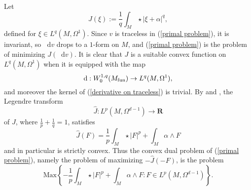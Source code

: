\documentclass[reqno,11pt]{amsart}
\newcommand{\RR}{\mathbf{R}}
\newcommand*\dif{\mathop{}\!\mathrm{d}}
\newcommand{\Max}{\mathrm{Max}}
\theoremstyle{definition}
\numberwithin{equation}{section}
\begin{document}
Let
$$J(\xi) := \frac{1}{q} \int_M \star|\xi + \alpha|^q,$$
defined for $\xi \in L^q(M, \Omega^1)$.
Since $v$ is traceless in (\ref{primal problem}), it is invariant, so $\dif v$ drops to a $1$-form on $M$, and (\ref{primal problem}) is the problem of minimizing $J(\dif v)$.
It is clear that $J$ is a suitable convex function on $L^q(M, \Omega^1)$ when it is equipped with the map
\begin{equation}\label{derivative on traceless}
\dif: W^{1, q}_0(M_{\rm fun}) \to L^q(M, \Omega^1),
\end{equation}
and moreover the kernel of (\ref{derivative on traceless}) is trivial.
By \cite[Chapter I, (4.9)]{Ekeland99} and \cite[Chapter I, Remark 4.1]{Ekeland99}, the Legendre transform
$$\hat J: L^p(M, \Omega^{d - 1}) \to \RR$$
of $J$, where $\frac{1}{p} + \frac{1}{q} = 1$, satisfies
\begin{equation}\label{Legendre transform}
\hat J(F) = \frac{1}{p} \int_M \star |F|^p + \int_M \alpha \wedge F
\end{equation}
and in particular is strictly convex.
Thus the convex dual problem of (\ref{primal problem}), namely the problem of maximizing $-\hat J(-F)$, is the problem
\begin{equation}\label{predual problem}
\Max\left\{- \frac{1}{p} \int_M \star |F|^p + \int_M \alpha \wedge F: F \in L^p(M, \Omega^{d - 1})\right\}.
\end{equation}
\end{document}
